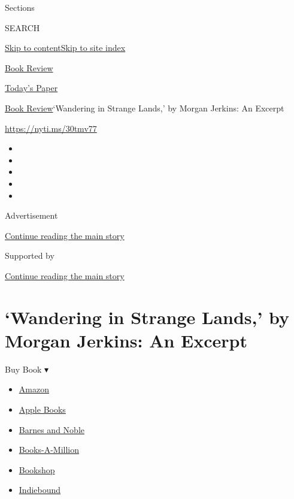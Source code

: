 Sections

SEARCH

\protect\hyperlink{site-content}{Skip to
content}\protect\hyperlink{site-index}{Skip to site index}

\href{https://www.nytimes3xbfgragh.onion/section/books/review}{Book
Review}

\href{https://myaccount.nytimes3xbfgragh.onion/auth/login?response_type=cookie\&client_id=vi}{}

\href{https://www.nytimes3xbfgragh.onion/section/todayspaper}{Today's
Paper}

\href{/section/books/review}{Book Review}\textbar{}`Wandering in Strange
Lands,' by Morgan Jerkins: An Excerpt

\url{https://nyti.ms/30tmv77}

\begin{itemize}
\item
\item
\item
\item
\item
\end{itemize}

Advertisement

\protect\hyperlink{after-top}{Continue reading the main story}

Supported by

\protect\hyperlink{after-sponsor}{Continue reading the main story}

\hypertarget{wandering-in-strange-lands-by-morgan-jerkins-an-excerpt}{%
\section{`Wandering in Strange Lands,' by Morgan Jerkins: An
Excerpt}\label{wandering-in-strange-lands-by-morgan-jerkins-an-excerpt}}

Buy Book ▾

\begin{itemize}
\tightlist
\item
  \href{https://www.amazon.com/gp/search?index=books\&tag=NYTBSREV-20\&field-keywords=Wandering+in+Strange+Lands\%3A+A+Daughter+of+the+Great+Migration+Reclaims+Her+Roots+Morgan+Jerkins}{Amazon}
\item
  \href{https://du-gae-books-dot-nyt-du-prd.appspot.com/buy?title=Wandering+in+Strange+Lands\%3A+A+Daughter+of+the+Great+Migration+Reclaims+Her+Roots\&author=Morgan+Jerkins}{Apple
  Books}
\item
  \href{https://www.anrdoezrs.net/click-7990613-11819508?url=https\%3A\%2F\%2Fwww.barnesandnoble.com\%2Fw\%2F\%3Fean\%3D9780062873040}{Barnes
  and Noble}
\item
  \href{https://www.anrdoezrs.net/click-7990613-35140?url=https\%3A\%2F\%2Fwww.booksamillion.com\%2Fp\%2FWandering\%2Bin\%2BStrange\%2BLands\%253A\%2BA\%2BDaughter\%2Bof\%2Bthe\%2BGreat\%2BMigration\%2BReclaims\%2BHer\%2BRoots\%2FMorgan\%2BJerkins\%2F9780062873040}{Books-A-Million}
\item
  \href{https://bookshop.org/a/3546/9780062873040}{Bookshop}
\item
  \href{https://www.indiebound.org/book/9780062873040?aff=NYT}{Indiebound}
\end{itemize}

